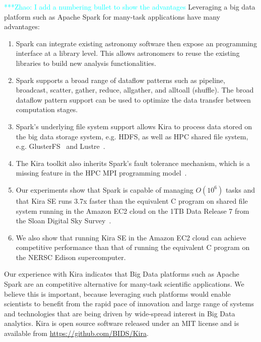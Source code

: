 \documentclass[conference]{IEEEtran}
\newcommand{\zhaonote}[1]{{\textcolor{cyan}    { ***Zhao:      #1 }}}
\newcommand{\franknote}[1]{{\textcolor{green}    { ***Frank:      #1 }}}
\newcommand{\zhaonote}[1]{}
\newcommand{\franknote}[1]{}
\begin{document}
\zhaonote{I add a numbering bullet to show the advantages}
Leveraging a big data platform such as Apache Spark for many-task applications have many advantages:
\begin{enumerate}
\item Spark can integrate existing astronomy software then expose an programming interface at a library level.
This allows astronomers to reuse the existing libraries to build new analysis functionalities.
\item Spark supports a broad range of dataflow patterns such as pipeline, broadcast, scatter, gather, reduce, allgather, 
and alltoall (shuffle). The broad dataflow pattern support can be used to optimize the data transfer between computation stages.
\item Spark's underlying file system support allows Kira to process data stored on the big data storage system, e.g. HDFS\cite{shvachko10}, 
as well as HPC shared file system, e.g. GlusterFS~\cite{davies13} and Lustre~\cite{donovan03}.
\item The Kira toolkit also inherits Spark's fault tolerance mechanism, which is a missing feature in the HPC MPI programming model~\cite{gropp96}.
\item Our experiments show that Spark is capable of managing $O(10^6)$ tasks and that Kira SE runs 3.7x faster than the equivalent C program on shared file system running in the Amazon EC2 cloud on the 1TB Data Release 7 from the Sloan Digital Sky Survey~\cite{york00}. 
\item We also show that running Kira SE in the Amazon EC2 cloud can achieve competitive performance than that of running the equivalent C program on the NERSC Edison supercomputer. 
\end{enumerate}

Our experience with Kira indicates that Big Data platforms such as Apache Spark are an competitive alternative for many-task scientific applications.   
We believe this is important, because leveraging such platforms would enable scientists to benefit from the rapid pace of innovation and large range of systems and technologies that are being driven by wide-spread interest in Big Data analytics.
Kira is open source software released under an MIT license and is available from \linebreak \url{https://github.com/BIDS/Kira}.


\end{document}
